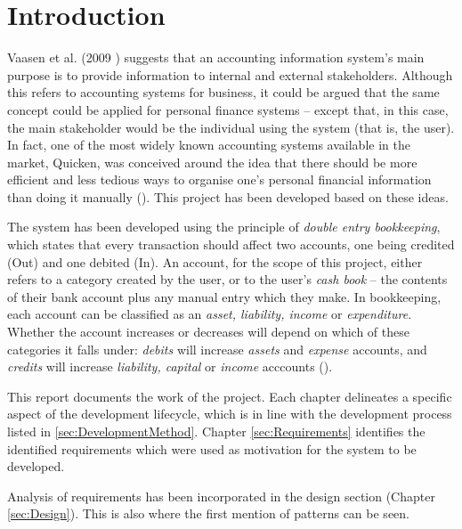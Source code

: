 \section{Introduction} \label{sec:Introduction}

Vaasen et al. (2009 \cite[cited][p.~8]{Boczko:2012:IAI:2331376}) suggests that
an accounting information system's main purpose is to provide information to
internal and external stakeholders. Although this refers to accounting systems
for business, it could be argued that the same concept could be applied for
personal finance systems -- except that, in this case, the main stakeholder
would be the individual using the system (that is, the user). In fact, one of
the most widely known accounting systems available in the market,
Quicken\texttrademark, was conceived around the idea that there should be more
efficient and less tedious ways to organise one's personal financial
information than doing it manually (\cite{quicken2017about}). This project has
been developed based on these ideas.

The system has been developed using the principle of \emph{double entry
bookkeeping}, which states that every transaction should affect two accounts,
one being credited (Out) and one debited (In). An account, for the scope of
this project, either refers to a category created by the user, or to the user's
\emph{cash book} -- the contents of their bank account plus any manual entry
which they make.  In bookkeeping, each account can be classified as an
\emph{asset, liability, income} or \emph{expenditure}. Whether the account
increases or decreases will depend on which of these categories it falls under:
\emph{debits} will increase \emph{assets} and \emph{expense} accounts, and
\emph{credits} will increase \emph{liability, capital} or \emph{income}
acccounts (\cite[][pp.~18-19]{wood2004book}).

This report documents the work of the project. Each chapter delineates a
specific aspect of the development lifecycle, which is in line with the
development process listed in \ref{sec:DevelopmentMethod}. Chapter
\ref{sec:Requirements} identifies the identified requirements which were used
as motivation for the system to be developed.

Analysis of requirements has been incorporated in the design section (Chapter
\ref{sec:Design}). This is also where the first mention of patterns can be
seen.
